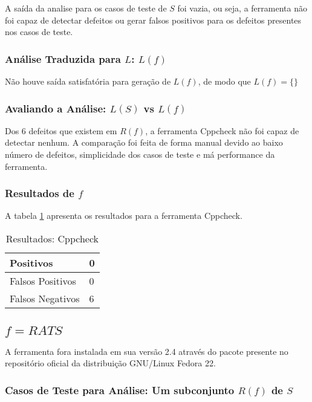 A saída da analise para os casos de teste de $S$ foi vazia, ou seja, a ferramenta não foi capaz de detectar defeitos ou gerar falsos positivos para os defeitos presentes nos casos de teste.

\subsubsection{Análise Traduzida para $L$: $L(f)$}

Não houve saída satisfatória para geração de $L(f)$, de modo que 
$L(f) = \lbrace\rbrace$
\subsubsection{Avaliando a Análise: $L(S)$ vs $L(f)$}

Dos 6 defeitos que existem em $R(f)$, a ferramenta Cppcheck não foi capaz de detectar nenhum. A comparação foi feita de forma manual devido ao baixo número de defeitos, simplicidade dos casos de teste e má performance da ferramenta.

\subsubsection{Resultados de $f$}

A tabela \ref{tabela_cppcheck} apresenta os resultados para a ferramenta Cppcheck.
\begin{table}[h]
  \centering
\begin{tabular}{| l | l |}
  \hline
  Positivos & 0 \\ \hline
  Falsos Positivos & 0 \\ \hline
  Falsos Negativos & 6 \\
  \hline
\end{tabular}
\caption{Resultados: Cppcheck}
\label{tabela_cppcheck}
\end{table}
\subsection{$f = RATS$}

A ferramenta fora instalada em sua versão 2.4 através do pacote presente no repositório oficial da distribuição GNU/Linux Fedora 22.

\subsubsection{Casos de Teste para Análise: Um subconjunto $R(f)$ de $S$}

